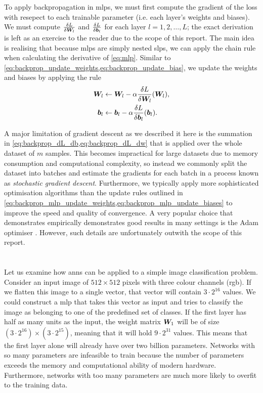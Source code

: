 \documentclass[../main.tex]{subfiles}
\begin{document}
\subsubsection{}
To apply backpropagation in \glspl{mlp}, we must first compute the gradient of the loss with resepect to each trainable parameter (i.e. each layer's weights and biases).
We must compute $\frac{\delta L}{\delta {\bm{W}}_l}$ and $\frac{\delta L}{\delta {\bm{b}}_l}$ for each layer $l=1,2,\dots,L$; the exact derivation is left as an exercise to the reader due to the scope of this report.
The main idea is realising that because \glspl{mlp} are simply nested \glspl{slp}, we can apply the chain rule when calculating the derivative of \cref{eq:mlp}.
Similar to \cref{eq:backprop_update_weights,eq:backprop_update_bias}, we update the weights and biases by applying the rule
\begin{align}
    \label{eq:backprop_mlp_update_weights}
    {\bm{W}}_l &\gets {\bm{W}}_l - \alpha \frac{\delta L}{\delta {\bm{W}}_l}({\bm{W}}_l),\\
    \label{eq:backprop_mlp_update_biases}
    {\bm{b}}_l &\gets {\bm{b}}_l - \alpha \frac{\delta L}{\delta {\bm{b}}_l}({\bm{b}}_l).
\end{align}

A major limitation of gradient descent as we described it here is the summation in \cref{eq:backprop_dL_db,eq:backprop_dL_dw} that is applied over the whole dataset of $m$ samples. 
This becomes impractical for large datasets due to memory consumption and computational complexity, so instead we commonly split the dataset into batches and estimate the gradients for each batch in a process known as \emph{stochastic gradient descent}.
Furthermore, we typically apply more sophisticated optimisation algorithms than the update rules outlined in \cref{eq:backprop_mlp_update_weights,eq:backprop_mlp_update_biases} to improve the speed and quality of convergence.
A very popular choice that demonstrates empirically demonstrates good results in many settings is the Adam optimiser \cite{kingma2017}.
However, such details are unfortunately outwith the scope of this report.

\section{}
Let us examine how \glspl{ann} can be applied to a simple image classification problem.
Consider an input image of $512 \times 512$ pixels with three colour channels (\gls{rgb}).
If we flatten this image to a single vector, that vector will contain $3 \cdot 2^{16}$ values.
We could construct a \gls{mlp} that takes this vector as input and tries to classify the image as belonging to one of the predefined set of classes.
If the first layer has half as many units as the input, the weight matrix ${\bm{W}}_1$ will be of size $(3 \cdot 2^{16}) \times (3 \cdot 2^{15})$, meaning that it will hold $9 \cdot 2^{31}$ values.
This means that the first layer alone will already have over two billion parameters.
Networks with so many parameters are infeasible to train because the number of parameters exceeds the memory and computational ability of modern hardware.
Furthermore, networks with too many parameters are much more likely to overfit to the training data.
\end{document}
